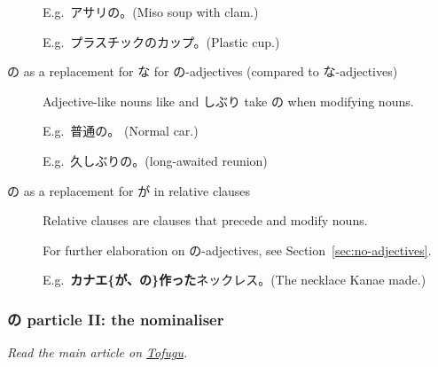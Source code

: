 \documentclass[../nihongo-gakushuu-kyouzai.tex]{subfiles}
\begin{document}
\begin{description}
    E.g.\ アサリの。(Miso soup with clam.)

    E.g.\ プラスチックのカップ。(Plastic cup.)
    \item[の as a replacement for な for の-adjectives (compared to な-adjectives)] Adjective-like nouns like  and しぶり take の when modifying nouns.

    E.g.\ 普通の。 (Normal car.)

    E.g.\ 久しぶりの。(long-awaited reunion)
    \item[の as a replacement for が in relative clauses] Relative clauses are clauses that precede and modify nouns.

    For further elaboration on の-adjectives, see Section~\ref{sec:no-adjectives}.

    E.g.\ \textbf{カナエ\{が、の\}作った}ネックレス。(The necklace Kanae made.)
\end{description}



\subsubsection{の particle II: the nominaliser} \label{sec:no-the-nominaliser}
\emph{Read the main article on \href{https://www.tofugu.com/japanese-grammar/particle-no-nominalizer/}{Tofugu}.}
\end{document}
